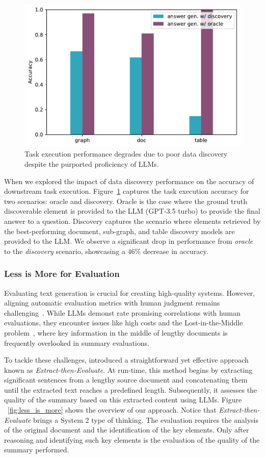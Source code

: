  

\begin{figure}[!htb]
    \centering
    \includegraphics[width=0.5\linewidth]{submissions/Estevam2024/figures/answer_gen.pdf}
    \caption{Task execution performance degrades due to poor data discovery despite the purported proficiency of LLMs. }
    \label{fig:answer_gen}
    \vspace{-10pt}
\end{figure}

When we explored the impact of data discovery performance on the accuracy of downstream task execution. Figure~\ref{fig:answer_gen} captures the task execution accuracy for two scenarios: oracle and discovery. Oracle is the case where the ground truth discoverable element is provided to the LLM (\eg GPT-3.5 turbo) to provide the final answer to a question. Discovery captures the scenario where elements retrieved by the best-performing document, sub-graph, and table discovery models are provided to the LLM. We observe a significant drop in performance from \emph{oracle} to the \emph{discovery} scenario,  showcasing a $46\%$ decrease in accuracy.

\subsubsection{Less is More for Evaluation}


Evaluating text generation is crucial for creating high-quality systems. However, aligning automatic evaluation metrics with human judgment remains challenging~\cite{bhandari-etal-2020-evaluating,fabbri2021summeval}. While LLMs demonst
rate promising correlations with human evaluations, they encounter issues like high costs and the Lost-in-the-Middle problem~\cite{liu2023lost}, where key information in the middle of lengthy documents is frequently overlooked in summary evaluations.

To tackle these challenges, \cite{wu2024less} introduced a straightforward yet effective approach known as \textit{Extract-then-Evaluate}. At run-time, this method begins by extracting significant sentences from a lengthy source document and concatenating them until the extracted text reaches a predefined length. Subsequently, it assesses the quality of the summary based on this extracted content using LLMs. Figure ~\ref{fig:less_is_more} shows the overview of our approach. Notice that \emph{Extract-then-Evaluate} brings a System 2 type of thinking. The evaluation requires the analysis of the original document and the identification of the key elements. Only after reasoning and identifying such key elements is the evaluation of the quality of the summary performed.

